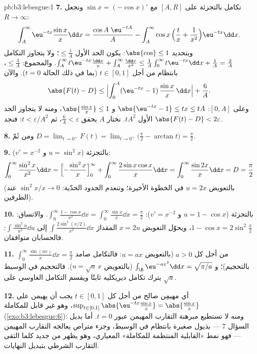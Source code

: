 \begin{solution}{pb:b3:lebesgue:1}
\textbf{7.} نكامل بالتجزئة على $[A, R]$ مع $\sin x =
(-\cos x)'$ ونجعل
$R \to \infty$:
\[
\int_A^{\infty}\eu^{-tx}\frac{\sin x}x\dd x
= \frac{\cos A\;\eu^{-tA}}{A}
- \int_A^\infty \cos x\,\Bigl(\frac tx +
\frac1{x^2}\Bigr)\eu^{-tx}\dd x .
\]
وبتحديد $\abs{\cos} \leq 1$: يكون الحد الأول $\leq \frac1A$؛ ولا يتجاوز
التكامل $\int_A^\infty t\eu^{-tx}\frac{\dd x}x
+ \int_A^\infty\frac{\dd x}{x^2} \leq \frac1A\int_0^\infty
t\eu^{-tx}\dd x + \frac1A = \frac2A$. والمجموع: $\leq \frac 3A$، بانتظام من أجل
$t \in [0, 1]$ (بما في ذلك الحالة $t = 0$). والآن
\[
\abs{F(t) - D} \leq
\Bigl|\int_0^A(\eu^{-tx} - 1)\,\frac{\sin x}x\,\dd x\Bigr| +
\frac6A .
\]
وعلى $[0, A]$: $\abs{\eu^{-tx} - 1} \leq tx \leq tA$ و $\abs{\frac{\sin x}x} \leq 1$، ومنه لا يتجاوز الحد الأول
$tA^2$. نختار $A$ يحقق $\frac6A < \varepsilon$، ثم $t <
\varepsilon/A^2$: فنجد $\abs{F(t) - D} < 2\varepsilon$.

\textbf{8.} ومن ثَمّ $D = \lim_{t\to0^+}F(t) =
\lim_{t\to0^+}\bigl(\frac\pi2 - \arctan t\bigr) =
\frac\pi2$.

\textbf{9.} بالتجزئة ($u = \sin^2x$ و $v' = x^{-2}$):
\[
\int_0^\infty\frac{\sin^2x}{x^2}\dd x
= \Bigl[-\frac{\sin^2x}{x}\Bigr]_0^\infty +
\int_0^\infty\frac{2\sin x\cos x}{x}\dd x
= \int_0^\infty\frac{\sin 2x}{x}\dd x = D = \frac\pi2
\]
(بالتعويض $u = 2x$ في الخطوة الأخيرة؛ وتنعدم الحدود الحدّية:
$\sin^2 x/x \to 0$ عند الطرفين).

\textbf{10.} بالتجزئة ($u = 1 - \cos x$ و $v' = x^{-2}$):
$\int_0^\infty\frac{1 - \cos x}{x^2}\dd x =
\int_0^\infty\frac{\sin x}x\dd x = \frac\pi2$. والاتساق: $1 - \cos x = 2\sin^2\frac x2$، ويحوّل التعويض $x = 2u$ المقدارَ
$\int\frac{2\sin^2(x/2)}{x^2}\dd x$ إلى $\int\frac{\sin^2u}{u^2}\dd u$: فالحسابان متوافقان.

\textbf{11.} $\int_0^\infty\frac{\sin(ax)}x\dd x = \frac\pi2$ من أجل كل $a > 0$ (بالتعويض $u = ax$:
فالتكامل صامد بالتحجيم)؛ و $\int_\R\eu^{-ax^2}\dd x = \sqrt{\pi/a}$ (بالتعويض $u = \sqrt a\,x$).
فالتحجيم في الوسيط يترك تكامل ديريكليه ثابتًا ويقسم التكامل
الغاوسي على $\sqrt a$.

\textbf{12.} أي مهيمِن صالح من أجل كل $t \in [0,1]$ يجب أن
يهيمن على $\sup_{t\in[0,1]}\abs{\eu^{-tx}\frac{\sin
x}x} = \abs{\frac{\sin x}x}$، وهو غير قابل للمكاملة (\cref{exo:b3:lebesgue:6}): ومنه لا
تستطيع مبرهنة التقارب المهيمن عبور $t = 0$. أما بديل السؤال 7
--- بذيول صغيرة بانتظام في الوسيط، وجزء متراص يعالجه التقارب
المهيمن --- فهو نمط «القابلية المنتظمة للمكاملة» المعياري، وهو
يظهر من جديد كلما التقى التقارب الشرطي بتبديل النهايات.


\end{solution}
